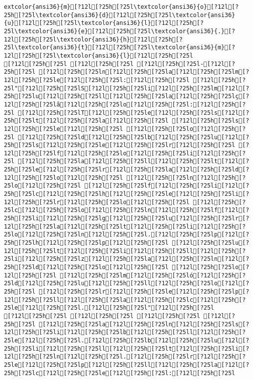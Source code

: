 \documentclass{scrartcl}
\begin{document}
\begin{Verbatim}
extcolor{ansi36}{m}[?12l[?25h[?25l\textcolor{ansi36}{o}[?12l[?25h[?25l\textcolor{ansi36}{d}[?12l[?25h[?25l\textcolor{ansi36}{u}[?12l[?25h[?25l\textcolor{ansi36}{l}[?12l[?25h[?25l\textcolor{ansi36}{e}[?12l[?25h[?25l\textcolor{ansi36}{.}[?12l[?25h[?25l\textcolor{ansi36}{h}[?12l[?25h[?25l\textcolor{ansi36}{t}[?12l[?25h[?25l\textcolor{ansi36}{m}[?12l[?25h[?25l\textcolor{ansi36}{l}[?12l[?25h[?25l
[?12l[?25h[?25l [?12l[?25h[?25l [?12l[?25h[?25l-[?12l[?25h[?25l [?12l[?25h[?25ln[?12l[?25h[?25la[?12l[?25h[?25lm[?12l[?25h[?25le[?12l[?25h[?25l:[?12l[?25h[?25l [?12l[?25h[?25l"[?12l[?25h[?25lS[?12l[?25h[?25li[?12l[?25h[?25lm[?12l[?25h[?25lu[?12l[?25h[?25ll[?12l[?25h[?25la[?12l[?25h[?25lç[?12l[?25h[?25lã[?12l[?25h[?25lo[?12l[?25h[?25l:[?12l[?25h[?25l [?12l[?25h[?25lT[?12l[?25h[?25le[?12l[?25h[?25ls[?12l[?25h[?25lt[?12l[?25h[?25la[?12l[?25h[?25l [?12l[?25h[?25ls[?12l[?25h[?25le[?12l[?25h[?25l [?12l[?25h[?25lo[?12l[?25h[?25l [?12l[?25h[?25ld[?12l[?25h[?25lb[?12l[?25h[?25lu[?12l[?25h[?25ls[?12l[?25h[?25le[?12l[?25h[?25lr[?12l[?25h[?25l [?12l[?25h[?25lf[?12l[?25h[?25lo[?12l[?25h[?25li[?12l[?25h[?25l [?12l[?25h[?25la[?12l[?25h[?25ll[?12l[?25h[?25lt[?12l[?25h[?25le[?12l[?25h[?25lr[?12l[?25h[?25la[?12l[?25h[?25ld[?12l[?25h[?25lo[?12l[?25h[?25l [?12l[?25h[?25ln[?12l[?25h[?25lo[?12l[?25h[?25l [?12l[?25h[?25lf[?12l[?25h[?25li[?12l[?25h[?25lc[?12l[?25h[?25lh[?12l[?25h[?25le[?12l[?25h[?25li[?12l[?25h[?25lr[?12l[?25h[?25lo[?12l[?25h[?25l [?12l[?25h[?25lc[?12l[?25h[?25lo[?12l[?25h[?25ln[?12l[?25h[?25lf[?12l[?25h[?25li[?12l[?25h[?25lg[?12l[?25h[?25lu[?12l[?25h[?25lr[?12l[?25h[?25la[?12l[?25h[?25lt[?12l[?25h[?25li[?12l[?25h[?25lo[?12l[?25h[?25ln[?12l[?25h[?25l.[?12l[?25h[?25lp[?12l[?25h[?25lh[?12l[?25h[?25lp[?12l[?25h[?25l [?12l[?25h[?25lu[?12l[?25h[?25lt[?12l[?25h[?25li[?12l[?25h[?25ll[?12l[?25h[?25li[?12l[?25h[?25lz[?12l[?25h[?25la[?12l[?25h[?25ln[?12l[?25h[?25ld[?12l[?25h[?25lo[?12l[?25h[?25l [?12l[?25h[?25lo[?12l[?25h[?25l [?12l[?25h[?25lm[?12l[?25h[?25ló[?12l[?25h[?25ld[?12l[?25h[?25lu[?12l[?25h[?25ll[?12l[?25h[?25lo[?12l[?25h[?25l [?12l[?25h[?25lr[?12l[?25h[?25le[?12l[?25h[?25lp[?12l[?25h[?25ll[?12l[?25h[?25la[?12l[?25h[?25lc[?12l[?25h[?25le[?12l[?25h[?25l.[?12l[?25h[?25l"[?12l[?25h[?25l
[?12l[?25h[?25l [?12l[?25h[?25l [?12l[?25h[?25l [?12l[?25h[?25l [?12l[?25h[?25la[?12l[?25h[?25ln[?12l[?25h[?25ls[?12l[?25h[?25li[?12l[?25h[?25lb[?12l[?25h[?25ll[?12l[?25h[?25le[?12l[?25h[?25l.[?12l[?25h[?25lb[?12l[?25h[?25lu[?12l[?25h[?25li[?12l[?25h[?25ll[?12l[?25h[?25lt[?12l[?25h[?25li[?12l[?25h[?25ln[?12l[?25h[?25l.[?12l[?25h[?25lr[?12l[?25h[?25le[?12l[?25h[?25lp[?12l[?25h[?25ll[?12l[?25h[?25la[?12l[?25h[?25lc[?12l[?25h[?25le[?12l[?25h[?25l:[?12l[?25h[?25l

\end{Verbatim}
\end{document}
